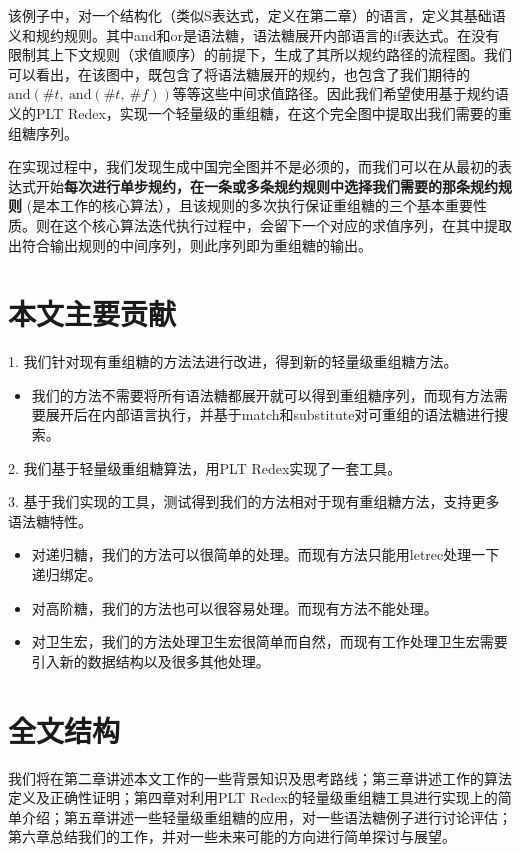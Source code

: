 该例子中，对一个结构化（类似S表达式，定义在第二章）的语言，定义其基础语义和规约规则。其中and和or是语法糖，语法糖展开内部语言的if表达式。在没有限制其上下文规则（求值顺序）的前提下，生成了其所以规约路径的流程图。我们可以看出，在该图中，既包含了将语法糖展开的规约，也包含了我们期待的$\mbox{and}(\#t,~\mbox{and}(\#t,~\#f))$等等这些中间求值路径。因此我们希望使用基于规约语义\cite{reduction}的PLT Redex，实现一个轻量级的重组糖，在这个完全图中提取出我们需要的重组糖序列。

在实现过程中，我们发现生成中国完全图并不是必须的，而我们可以在从最初的表达式开始{\bfseries 每次进行单步规约，在一条或多条规约规则中选择我们需要的那条规约规则 }(是本工作的核心算法），且该规则的多次执行保证重组糖的三个基本重要性质。则在这个核心算法迭代执行过程中，会留下一个对应的求值序列，在其中提取出符合输出规则的中间序列，则此序列即为重组糖的输出。


\label{mark:contribution}\section{本文主要贡献}
\begin{flushleft}
	1.	我们针对现有重组糖的方法法进行改进，得到新的轻量级重组糖方法。
\end{flushleft}

\begin{itemize}
	\item 我们的方法不需要将所有语法糖都展开就可以得到重组糖序列，而现有方法需要展开后在内部语言执行，并基于match和substitute对可重组的语法糖进行搜索。
	
\end{itemize}

\begin{flushleft}
	2.	我们基于轻量级重组糖算法，用PLT Redex实现了一套工具。
\end{flushleft}
\begin{flushleft}
	3.	基于我们实现的工具，测试得到我们的方法相对于现有重组糖方法，支持更多语法糖特性。
\end{flushleft}

\begin{itemize}
	\item 对递归糖，我们的方法可以很简单的处理。而现有方法只能用letrec处理一下递归绑定。
	\item 对高阶糖，我们的方法也可以很容易处理。而现有方法不能处理。
	\item 对卫生宏，我们的方法处理卫生宏很简单而自然，而现有工作处理卫生宏需要引入新的数据结构以及很多其他处理。
\end{itemize}

\section{全文结构}

我们将在第二章讲述本文工作的一些背景知识及思考路线；第三章讲述工作的算法定义及正确性证明；第四章对利用PLT Redex的轻量级重组糖工具进行实现上的简单介绍；第五章讲述一些轻量级重组糖的应用，对一些语法糖例子进行讨论评估；第六章总结我们的工作，并对一些未来可能的方向进行简单探讨与展望。
